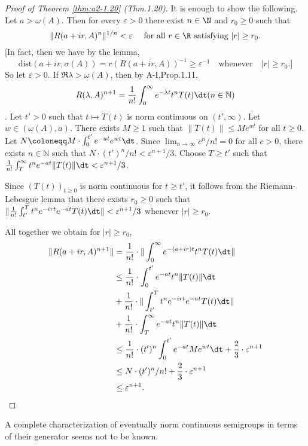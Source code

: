 \begin{proof}[Proof of Theorem  \ref{thm:a2-1.20} (\lnm Thm.1.20)]
It is enough to show the following.
Let $a > \omega(A)$.
Then for every $\varepsilon > 0$ there exist $n \in \N$ and $r_0 \geq 0$ such that
\[
\|R(a+ir,A)^n\|^{1/n} < \varepsilon \quad  \text{ for all } r \in \R \text{ satisfying } |r| \geq r_{0}.
\]
[In fact, then we have by the lemma, 
\[
\text{dist}(a+ir,\sigma(A)) = r(R(a+ir,A))^{-1} \geq \varepsilon^{-1} \quad \text{whenever} \quad |r| \geq r_{0}.]
\]
So let $\varepsilon > 0$.
If $\Re\lambda > \omega(A)$, then by A-I,Prop.1.11,
\[
R(\lambda,A)^{n+1} = \frac{1}{n!}\int_0^\infty e^{-\lambda t}t^nT(t) \dt (n \in \mathbb{N})
\].
Let $t' > 0$ such that $t \mapsto T(t)$ is norm continuous on $(t',\infty)$.
Let $w \in (\omega(A),a)$.
There exists $M \geq 1$ such that $\|T(t)\| \leq Me^{wt}$ for all $t \geq 0$.
Let $N \coloneqq M\cdot\int_{0}^{t'} e^{-at}e^{wt} \dt$.
Since $\lim_{n\to\infty} c^n/n! = 0$ for all $c > 0$, there exists $n \in \mathbb{N}$ such that $N\cdot(t')^n/n! < \varepsilon^{n+1}/3$.
Choose $T \geq t'$ such that $\frac{1}{n!}\int_T^\infty t^ne^{-at}\|T(t)\| \dt < \varepsilon^{n+1}/3$.

Since $(T(t))_{t\geq 0}$ is norm continuous for $t \geq t'$, it follows from the Riemann-Lebesgue lemma that there exists $r_{0} \geq 0$ such that 
$\|\frac{1}{n!}\int_{t'}^T t^{n}e^{-irt}e^{-at}T(t) \dt\| < \varepsilon^{n+1}/3$ whenever $|r| \geq r_{0}$.

All together we obtain for $|r| \geq r_{0}$,
\begin{align*}
    \|R(a+ir,A)^{n+1}\| & = \frac{1}{n!}\cdot\|\int_0^\infty e^{-(a+ir)t}t^nT(t) \dt\| \\
    & \leq \frac{1}{n!}\cdot\int_{0}^{t'} e^{-at}t^n\|T(t)\| \dt \\
    & + \frac{1}{n!}\cdot\|\int_{t'}^T t^ne^{-irt}e^{-at}T(t) \dt\| \\
    & + \frac{1}{n!}\cdot\int_T^\infty e^{-at}t^n\|T(t)\| \dt \\
    & \leq \frac{1}{n!}\cdot(t')^{n}\int_{0}^{t'} e^{-at}Me^{wt} \dt + \frac{2}{3}\cdot\varepsilon^{n+1} \\
    & \leq N\cdot(t')^n/n! + \frac{2}{3}\cdot\varepsilon^{n+1} \\
    & \leq \varepsilon^{n+1}.
\end{align*}
\end{proof}

A complete characterization of eventually norm continuous semigroups in terms of their generator seems not to be known.

